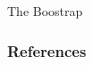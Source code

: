 \documentclass[handout]{beamer}
\begin{document}
\begin{frame}{The Boostrap}
 
\end{frame}





\begin{frame}[allowframebreaks]\scriptsize
\frametitle{References}


%
\end{frame}  








\end{document}
